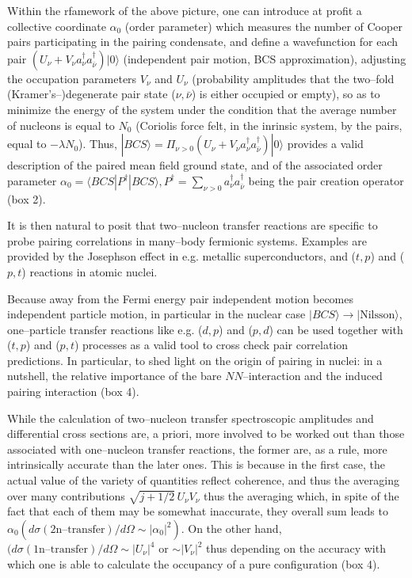 \documentclass[a4paper,11pt]{book}
\numberwithin{equation}{section}
\numberwithin{figure}{section}
\numberwithin{table}{section}
\begin{document}
Within the rfamework of the above picture, one can introduce at profit a collective coordinate $\alpha_0$ (order parameter) which measures the number of Cooper pairs participating in the pairing condensate, and define a wavefunction for each pair $\left(U_\nu+V_\nu a^\dagger_\nu a^\dagger_{\bar\nu}\right)|0\rangle$ (independent pair motion, BCS approximation), adjusting the occupation parameters $V_\nu$ and $U_\nu$ (probability amplitudes that the two--fold (Kramer's--)degenerate pair state ($\nu,\bar{\nu}$) is either occupied or empty), so as to minimize the energy of the system under the condition that the average number of nucleons is equal to $N_0$ (Coriolis force felt, in the inrinsic system, by the pairs, equal to $-\lambda N_0$). Thus, $|BCS\rangle=\Pi_{\nu>0}\left(U_\nu+V_\nu a^\dagger_\nu a^\dagger_{\bar\nu}\right)|0\rangle$ provides a valid description of the paired mean field ground state, and of the associated order parameter $\alpha_0=\langle BCS|P^{\dagger}|BCS\rangle, P^{\dagger}=\sum_{\nu>0}a^\dagger_\nu a^\dagger_{\bar \nu}$ being the pair creation operator (box 2).


It is then natural to posit that two--nucleon transfer reactions are specific to probe pairing correlations in many--body fermionic systems. Examples are provided by the Josephson effect in e.g. metallic superconductors, and ($t,p$) and ($p,t$) reactions in atomic nuclei.

Because away from the Fermi energy pair independent motion becomes independent particle motion, in particular in the nuclear case $|BCS\rangle\rightarrow|\text{Nilsson}\rangle$, one--particle transfer reactions like e.g. ($d,p$) and ($p,d$) can be used together with ($t,p$) and ($p,t$) processes as a valid tool to cross check pair correlation predictions. In particular, to shed light on the origin of pairing in nuclei: in a nutshell, the relative importance of the bare $NN$--interaction and the induced pairing interaction (box 4).

While the calculation of two--nucleon transfer spectroscopic amplitudes and differential cross sections are, a priori, more involved to be worked out than those associated with one--nucleon transfer reactions, the former are, as a rule, more intrinsically accurate than the later ones. This is because in the first case, the actual value of the variety of quantities reflect coherence, and thus the averaging over many contributions $\sqrt{j+1/2}\,U_\nu V_\nu$ thus the averaging which, in spite of the fact that each of them may be somewhat inaccurate, they overall sum leads to $\alpha_0(d\sigma(\text{2n--transfer})/d\Omega\sim|\alpha_0|^2)$. On the other hand, $(d\sigma(\text{1n--transfer})/d\Omega\sim|U_\nu|^4$ or $\sim |V_\nu|^2$ thus depending on the accuracy with which one is able to calculate the occupancy of a pure configuration (box 4).
\end{document}
